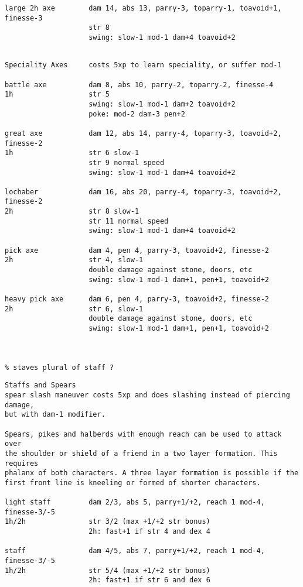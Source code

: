 \begin{verbatim}
large 2h axe        dam 14, abs 13, parry-3, toparry-1, toavoid+1, finesse-3
                    str 8
                    swing: slow-1 mod-1 dam+4 toavoid+2


\end{verbatim} \pagebreak[1] \begin{verbatim}
Speciality Axes     costs 5xp to learn speciality, or suffer mod-1

battle axe          dam 8, abs 10, parry-2, toparry-2, finesse-4
1h                  str 5
                    swing: slow-1 mod-1 dam+2 toavoid+2
                    poke: mod-2 dam-3 pen+2

great axe           dam 12, abs 14, parry-4, toparry-3, toavoid+2, finesse-2
1h                  str 6 slow-1
                    str 9 normal speed
                    swing: slow-1 mod-1 dam+4 toavoid+2

lochaber            dam 16, abs 20, parry-4, toparry-3, toavoid+2, finesse-2
2h                  str 8 slow-1
                    str 11 normal speed
                    swing: slow-1 mod-1 dam+4 toavoid+2

pick axe            dam 4, pen 4, parry-3, toavoid+2, finesse-2
2h                  str 4, slow-1
                    double damage against stone, doors, etc
                    swing: slow-1 mod-1 dam+1, pen+1, toavoid+2

heavy pick axe      dam 6, pen 4, parry-3, toavoid+2, finesse-2
2h                  str 6, slow-1
                    double damage against stone, doors, etc
                    swing: slow-1 mod-1 dam+1, pen+1, toavoid+2



% staves plural of staff ?
\end{verbatim} \pagebreak[3] \begin{verbatim}
Staffs and Spears
spear slash maneuver costs 5xp and does slashing instead of piercing damage, 
but with dam-1 modifier.

Spears, pikes and halberds with enough reach can be used to attack over 
the shoulder or shield of a friend in a two layer formation. This requires 
phalanx of both characters. A three layer formation is possible if the 
first front line is kneeling or formed of shorter characters.

light staff         dam 2/3, abs 5, parry+1/+2, reach 1 mod-4, finesse-3/-5
1h/2h               str 3/2 (max +1/+2 str bonus)
                    2h: fast+1 if str 4 and dex 4

staff               dam 4/5, abs 7, parry+1/+2, reach 1 mod-4, finesse-3/-5
1h/2h               str 5/4 (max +1/+2 str bonus)
                    2h: fast+1 if str 6 and dex 6


\end{verbatim}
